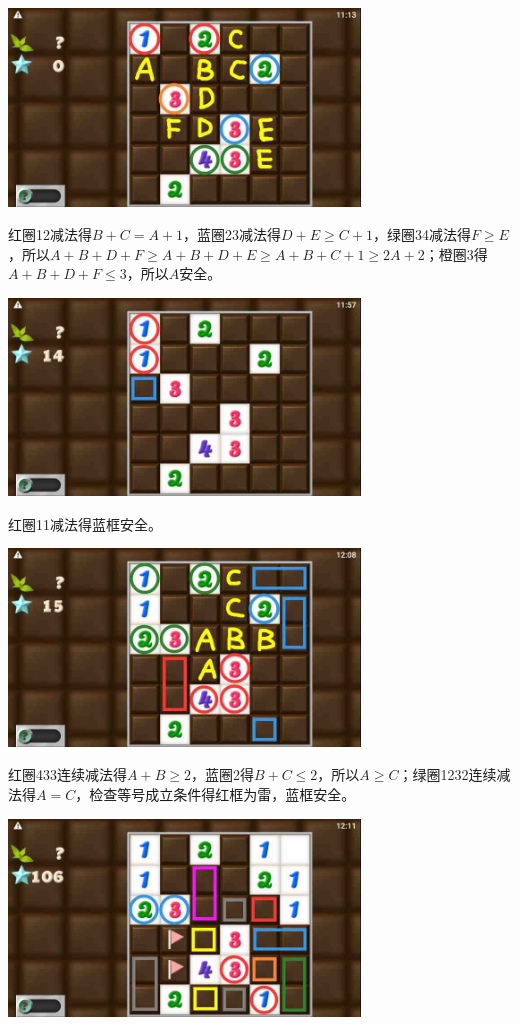 \subsection{} %
\begin{center}
    \includegraphics[width=0.7\textwidth]{puzzlelow/238-1.jpg}
\end{center}
红圈12减法得$B+C=A+1$，蓝圈23减法得$D+E\ge C+1$，绿圈34减法得$F\ge E$，所以$A+B+D+F\ge A+B+D+E\ge A+B+C+1\ge 2A+2$；橙圈3得$A+B+D+F\le 3$，所以$A$安全。
\begin{center}
    \includegraphics[width=0.7\textwidth]{puzzlelow/238-2.jpg}
\end{center}
红圈11减法得蓝框安全。
\begin{center}
    \includegraphics[width=0.7\textwidth]{puzzlelow/238-3.jpg}
\end{center}
红圈433连续减法得$A+B\ge 2$，蓝圈2得$B+C\le 2$，所以$A\ge C$；绿圈1232连续减法得$A=C$，检查等号成立条件得红框为雷，蓝框安全。
\begin{center}
    \includegraphics[width=0.7\textwidth]{puzzlelow/238-4.jpg}
\end{center}
